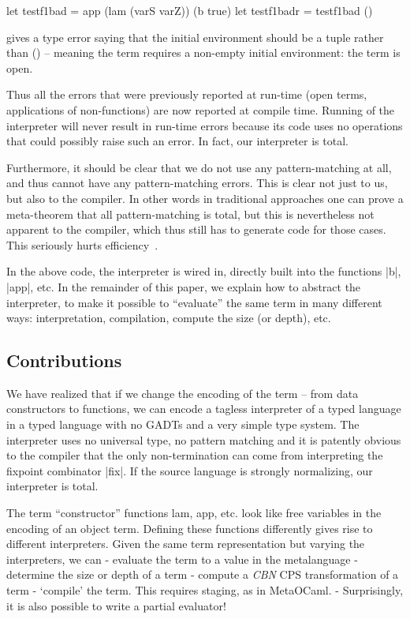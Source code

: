 \documentclass[preprint]{sigplanconf}
\let\cite=\citep
\begin{document}
\begin{code}
  let testf1bad = app (lam (varS varZ)) (b true)
  let testf1badr = testf1bad ()
\end{code}
gives a type error saying 
that the initial environment should be a tuple rather than () --
meaning the term requires a non-empty initial environment: the term is
open.

Thus all the errors that were previously reported at run-time (open terms,
applications of non-functions) are now reported at compile
time. Running of the interpreter will never result in run-time errors
because its code uses no operations that could possibly raise such
an error. In fact, our interpreter is total.

Furthermore, it should be clear that we do not use any
pattern-matching at all, and thus cannot have any pattern-matching
errors.  This is clear not just to us, but also to the compiler.
In other words in traditional approaches one can prove a meta-theorem
that all pattern-matching is total, but this is nevertheless not
apparent to the compiler, which thus still has to generate code for
those cases.  This seriously hurts efficiency~\cite{WalidICFP02}.

In the above code, the interpreter is wired in, directly built into the
functions |b|, |app|, etc.  In the remainder of this paper, 
we explain how to abstract the interpreter,
to make it possible to ``evaluate'' the same term in many different
ways: interpretation, compilation, compute the size (or depth), etc.

\subsection{Contributions}\label{contributions}

   We have realized that if we change the encoding of the term --
from data constructors to functions, we can encode a tagless
interpreter of a typed language in a typed language with no GADTs and
a very simple type system. The interpreter uses no universal type, no
pattern matching and it is patently obvious to the compiler that the
only non-termination can come from interpreting the fixpoint
combinator |fix|. If the source
language is strongly normalizing, our interpreter is total.

The term ``constructor'' functions lam, app, etc. look like free
variables in the encoding of an object term.  Defining these functions
differently gives rise to different interpreters.  Given the same term
representation but varying the interpreters, we can
	- evaluate the term to a value in the metalanguage
	- determine the size or depth of a term
    - compute a \emph{CBN} CPS transformation of a term
	- `compile' the term. This requires staging, as in MetaOCaml.
	- Surprisingly, it is also possible to write a partial evaluator! 
\end{document}
